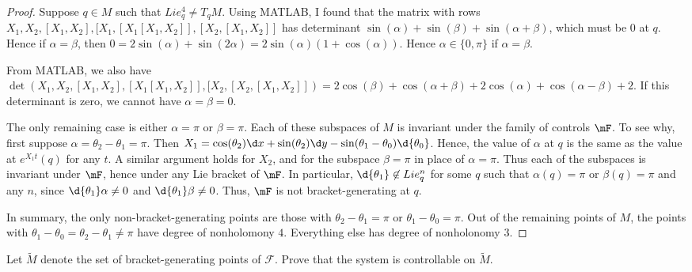 \documentclass{article}
\begin{document}
\begin{proof}
Suppose $q \in M$ such that $Lie^4_q \neq T_qM$. Using MATLAB, I found that the matrix with rows $X_1, X_2, [X_1, X_2], [X_1, [X_1 [X_1, X_2]], [X_2, [X_1, X_2]]$ has determinant $\sin(\alpha) + \sin(\beta) + \sin(\alpha + \beta)$, which must be $0$ at $q$.  Hence if $\alpha = \beta$, then $0 = 2\sin(\alpha) + \sin(2 \alpha) = 2 \sin(\alpha) (1 + \cos(\alpha))$. Hence $\alpha \in \{0, \pi\}$ if $\alpha = \beta$. 

From MATLAB, we also have $\det(X_1, X_2, [X_1, X_2], [X_1 [X_1, X_2]], [X_2, [X_2, [X_1, X_2]]) = 2 \cos(\beta) + \cos(\alpha + \beta) + 2 \cos(\alpha) + \cos(\alpha - \beta) + 2$. If this determinant is zero, we cannot have $\alpha = \beta = 0$.  

The only remaining case is either $\alpha = \pi$ or $\beta = \pi$. Each of these subspaces of $M$ is invariant under the family of controls $\mF$.  To see why, first suppose $\alpha = \theta_2 - \theta_1 = \pi$. Then $X_1 = \cos(\theta_2) \d x + \sin(\theta_2) \d y - \sin(\theta_1 - \theta_0) \d {\theta_0}$. Hence, the value of $\alpha$ at $q$ is the same as the value at $e^{X_1t}(q)$ for any $t$.  A similar argument holds for $X_2$, and for the subspace $\beta = \pi$ in place of $\alpha = \pi$.  Thus each of the subspaces is invariant under $\mF$, hence under any Lie bracket of $\mF$.  In particular, $\d {\theta_1} \not\in Lie_q^n$ for some $q$ such that $\alpha(q) = \pi$ or $\beta(q) = \pi$ and any $n$, since $\d {\theta_1} \alpha \neq 0$ and $\d {\theta_1} \beta \neq 0$.  Thus, $\mF$ is not bracket-generating at $q$.

In summary, the only non-bracket-generating points are those with $\theta_2 - \theta_1 = \pi$ or $\theta_1 - \theta_0 = \pi$.  Out of the remaining points of $M$, the points with $\theta_1 - \theta_0 = \theta_2 - \theta_1 \neq \pi$ have degree of nonholomony $4$.  Everything else has degree of nonholonomy $3$.

\end{proof}


 Let $\widetilde M$ denote the set of bracket-generating points of $\mathcal F$. Prove that the system is controllable on $\widetilde M$.
\end{document}

